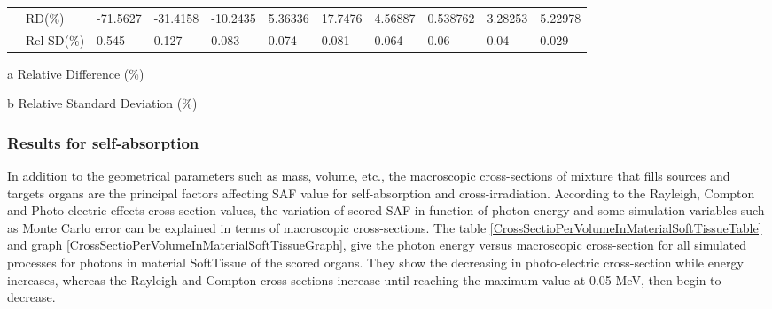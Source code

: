 \documentclass[letterpaper,12pt]{article}
\begin{document}
\begin{table}[H]
\begin{adjustbox}{width=\columnwidth,center}
\begin{threeparttable}
\begin{tabular}{lllllllllll}
                             & RD(\%)\tnote{a}                                         & -71.5627        & -31.4158        & -10.2435        & 5.36336        & 17.7476        & 4.56887        & 0.538762        & 3.28253        & 5.22978        \\ 
                             & Rel SD(\%)\tnote{b}                                          & 0.545        & 0.127        & 0.083        & 0.074        & 0.081        & 0.064        & 0.06        & 0.04        & 0.029        \\ \hline
\end{tabular} 
\begin{tablenotes}\footnotesize
\item[a] Relative Difference (\%)
\item[b] Relative Standard Deviation (\%)
\end{tablenotes}
\end{threeparttable}
\end{adjustbox}
\label{CrossFromAdrenal}
\end{table}

\subsubsection{Results for self-absorption} 

In addition to the geometrical parameters such as mass, volume, etc., the macroscopic cross-sections of mixture that fills sources and targets organs are the principal factors affecting SAF value for self-absorption and cross-irradiation. According to the Rayleigh, Compton and Photo-electric effects cross-section values, the variation of scored SAF in function of photon energy and some simulation variables such as Monte Carlo error can be explained in terms of macroscopic cross-sections. The table \ref{CrossSectioPerVolumeInMaterialSoftTissueTable} and graph \ref{CrossSectioPerVolumeInMaterialSoftTissueGraph}, give the photon energy versus macroscopic cross-section for all simulated processes for photons in material SoftTissue of the scored organs. They show the decreasing in photo-electric cross-section while energy increases, whereas the Rayleigh and Compton cross-sections increase until reaching the maximum value at 0.05 MeV, then begin to decrease.
\end{document}
